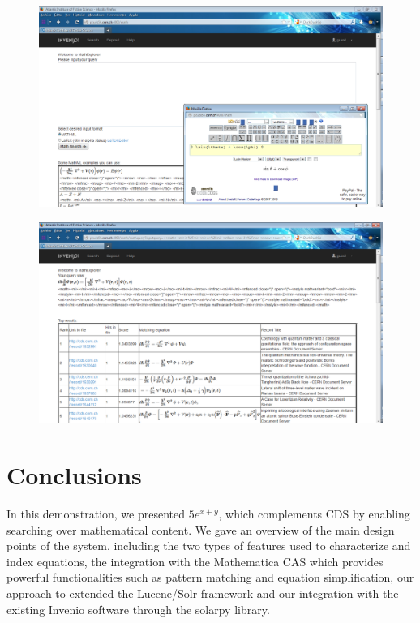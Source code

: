 \documentclass{sig-alternate}
\begin{document}
\begin{figure}
\centering
\begin{minipage}{.27\textwidth}
  \includegraphics[width=0.9\linewidth]{images/figures/input_interface.png}
  \label{fig:test1}
\end{minipage}%
\begin{minipage}{.27\textwidth}
  \includegraphics[width=0.9\linewidth]{images/figures/results_interface.png}
  \label{fig:test2}
\end{minipage}
\end{figure}

\section{Conclusions}
In this demonstration, we presented $5e^{x+y}$, which complements CDS by enabling searching over mathematical content. We gave an overview of the main design points of the system, including the two types of features used to characterize and index equations, the integration with the Mathematica CAS which provides powerful functionalities such as pattern matching and equation simplification, our approach to extended the Lucene/Solr framework and our integration with the existing Invenio software through the solarpy library.
\end{document}
